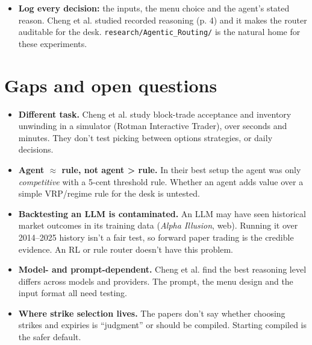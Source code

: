 \documentclass{article}
\begin{document}
\begin{itemize}
\begin{enumerate}
\item \textbf{An LLM agent} with the pipeline features as input, choosing from the menu. Test its reasoning setting (off /\allowbreak{} low /\allowbreak{} higher), because the best level depends on the model (p. 6, p. 25).

\item \textbf{Optionally, an RL router} like OPHR's, which is compiled in Cheng's terms. It needs historical training data, e.g. the club's R2 dataset.

\end{enumerate}

\item \textbf{Log every decision:} the inputs, the menu choice and the agent's stated reason. Cheng et al. studied recorded reasoning (p. 4) and it makes the router auditable for the desk. \texttt{research/\allowbreak{}Agentic\_\allowbreak{}Routing/\allowbreak{}} is the natural home for these experiments.

\end{itemize}

\section{Gaps and open questions}

\begin{itemize}

\item \textbf{Different task.} Cheng et al. study block-trade acceptance and inventory unwinding in a simulator (Rotman Interactive Trader), over seconds and minutes. They don't test picking between options strategies, or daily decisions.

\item \textbf{Agent \ensuremath{\approx} rule, not agent > rule.} In their best setup the agent was only \emph{competitive} with a 5-cent threshold rule. Whether an agent adds value over a simple VRP/\allowbreak{}regime rule for the desk is untested.

\item \textbf{Backtesting an LLM is contaminated.} An LLM may have seen historical market outcomes in its training data (\emph{Alpha Illusion}, web). Running it over 2014--2025 history isn't a fair test, so forward paper trading is the credible evidence. An RL or rule router doesn't have this problem.

\item \textbf{Model- and prompt-dependent.} Cheng et al. find the best reasoning level differs across models and providers. The prompt, the menu design and the input format all need testing.

\item \textbf{Where strike selection lives.} The papers don't say whether choosing strikes and expiries is ``judgment'' or should be compiled. Starting compiled is the safer default.

\end{itemize}
\end{document}
